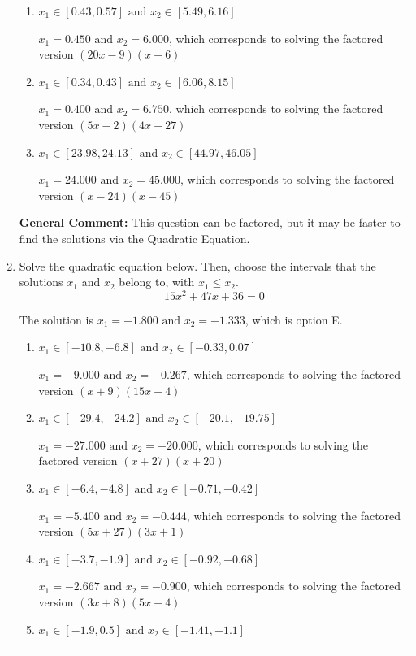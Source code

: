 \documentclass{extbook}[14pt]
\newcommand{\litem}[1]{\item #1

\rule{\textwidth}{0.4pt}}
\begin{document}
\begin{enumerate}
{\begin{enumerate}[label=\Alph*.]
$x_1 = 0.750 \text{ and } x_2 = 3.600$, which corresponds to solving the factored version $(4x -3)(5x -18)$
\item \( x_1 \in [0.43, 0.57] \text{ and } x_2 \in [5.49, 6.16] \)

$x_1 = 0.450 \text{ and } x_2 = 6.000$, which corresponds to solving the factored version $(20x -9)(x -6)$
\item \( x_1 \in [0.34, 0.43] \text{ and } x_2 \in [6.06, 8.15] \)

$x_1 = 0.400 \text{ and } x_2 = 6.750$, which corresponds to solving the factored version $(5x -2)(4x -27)$
\item \( x_1 \in [23.98, 24.13] \text{ and } x_2 \in [44.97, 46.05] \)

$x_1 = 24.000 \text{ and } x_2 = 45.000$, which corresponds to solving the factored version $(x -24)(x -45)$
\end{enumerate}

\textbf{General Comment:} This question can be factored, but it may be faster to find the solutions via the Quadratic Equation.
}
\litem{
Solve the quadratic equation below. Then, choose the intervals that the solutions $x_1$ and $x_2$ belong to, with $x_1 \leq x_2$.
\[ 15x^{2} +47 x + 36 = 0 \]

The solution is \( x_1 = -1.800 \text{ and } x_2 = -1.333 \), which is option E.\begin{enumerate}[label=\Alph*.]
\item \( x_1 \in [-10.8, -6.8] \text{ and } x_2 \in [-0.33, 0.07] \)

$x_1 = -9.000 \text{ and } x_2 = -0.267$, which corresponds to solving the factored version $(x + 9)(15x + 4)$
\item \( x_1 \in [-29.4, -24.2] \text{ and } x_2 \in [-20.1, -19.75] \)

$x_1 = -27.000 \text{ and } x_2 = -20.000$, which corresponds to solving the factored version $(x + 27)(x + 20)$
\item \( x_1 \in [-6.4, -4.8] \text{ and } x_2 \in [-0.71, -0.42] \)

$x_1 = -5.400 \text{ and } x_2 = -0.444$, which corresponds to solving the factored version $(5x + 27)(3x + 1)$
\item \( x_1 \in [-3.7, -1.9] \text{ and } x_2 \in [-0.92, -0.68] \)

$x_1 = -2.667 \text{ and } x_2 = -0.900$, which corresponds to solving the factored version $(3x + 8)(5x + 4)$
\item \( x_1 \in [-1.9, 0.5] \text{ and } x_2 \in [-1.41, -1.1] \)


\end{enumerate}}
\end{enumerate}
\end{document}
